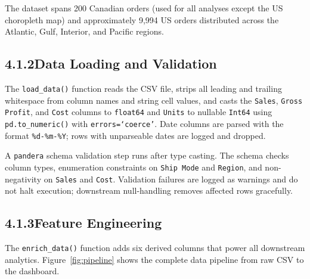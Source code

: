\documentclass[12pt, a4paper]{report}
\begin{document}
\noindent The dataset spans 200 Canadian orders (used for all analyses except
the US choropleth map) and approximately 9{,}994 US orders distributed
across the Atlantic, Gulf, Interior, and Pacific regions.

\subsection*{4.1.2\quad Data Loading and Validation}

The \texttt{load\_data()} function reads the CSV file, strips all leading and
trailing whitespace from column names and string cell values, and casts
the \texttt{Sales}, \texttt{Gross Profit}, and \texttt{Cost} columns to
\texttt{float64} and \texttt{Units} to nullable \texttt{Int64} using
\texttt{pd.to\_numeric()\allowbreak} with \texttt{errors=`coerce'}.
Date columns are parsed
with the format \texttt{\%d-\%m-\%Y}; rows with unparseable dates are
logged and dropped.

A \texttt{pandera} schema validation step runs after type casting. The schema
checks column types, enumeration constraints on \texttt{Ship Mode} and
\texttt{Region}, and non-negativity on \texttt{Sales} and \texttt{Cost}.
Validation failures are logged as warnings and do not halt execution;
downstream null-handling removes affected rows gracefully.

\subsection*{4.1.3\quad Feature Engineering}

The \texttt{enrich\_data()} function adds six derived columns that power
all downstream analytics. Figure~\ref{fig:pipeline} shows the complete
data pipeline from raw CSV to the dashboard.
\end{document}
